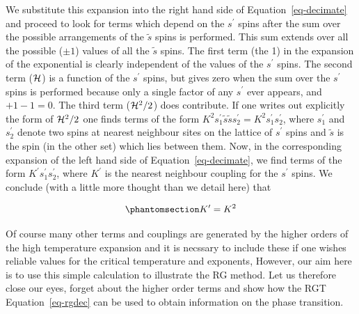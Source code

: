\documentclass[
  letterpaper,
  enabledeprecatedfontcommands]{report}
\begin{document}
\begin{tcolorbox}
We substitute this expansion into the right hand side of
Equation~\ref{eq-decimate} and proceed to look for terms which depend on
the \(s^\prime\) spins after the sum over the possible arrangements of
the \(\tilde{s}\) spins is performed. This sum extends over all the
possible (\(\pm 1\)) values of all the \(\tilde{s}\) spins. The first
term (the 1) in the expansion of the exponential is clearly independent
of the values of the \(s^\prime\) spins. The second term (\({\cal H}\))
is a function of the \(s^\prime\) spins, but gives zero when the sum
over the \(s^\prime\) spins is performed because only a single factor of
any \(s^\prime\) ever appears, and \(+ 1 - 1 = 0\). The third term
(\({\cal H}^2/2\)) does contribute. If one writes out explicitly the
form of \({\cal H}^2/2\) one finds terms of the form
\(K^2s_1^\prime\tilde{s}\tilde{s}s_2^\prime=K^2s_1^\prime s_2^\prime\),
where \(s_1^\prime\) and \(s_2^\prime\) denote two spins at nearest
neighbour sites on the lattice of \(s^\prime\) spins and \(\tilde{s}\)
is the spin (in the other set) which lies between them. Now, in the
corresponding expansion of the left hand side of
Equation~\ref{eq-decimate}, we find terms of the form
\(K^\prime s_1^\prime s_2^\prime\), where \(K^\prime\) is the nearest
neighbour coupling for the \(s^\prime\) spins. We conclude (with a
little more thought than we detail here) that

\begin{equation}\phantomsection\label{eq-rgdec}{
K^\prime=K^2
}\end{equation}

Of course many other terms and couplings are generated by the higher
orders of the high temperature expansion and it is necssary to include
these if one wishes reliable values for the critical temperature and
exponents, However, our aim here is to use this simple calculation to
illustrate the RG method. Let us therefore close our eyes, forget about
the higher order terms and show how the RGT Equation~\ref{eq-rgdec} can
be used to obtain information on the phase transition.

\begin{figure}[H]

\end{figure}
\end{tcolorbox}
\end{document}

